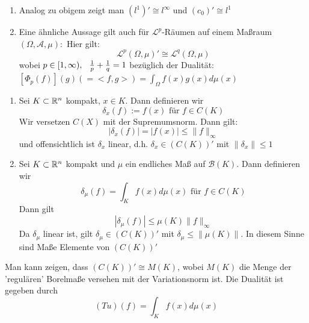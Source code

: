\begin{bemerkung}
	\begin{enumerate}[label=\alph*\upshape)]
		\item Analog zu obigem zeigt man $(l^{1})' \cong l^{\infty}$ und $(c_{0})' \cong l^{1}$
		\item Eine ähnliche Aussage gilt auch für $\mathcal{L}^{p}$-Räumen auf einem Ma{\ss}raum $(\Omega, \mathcal{A}, \mu):$
			Hier gilt:
			\[ \mathcal{L}^{p}(\Omega, \mu)' \cong \mathcal{L}^{q}(\Omega, \mu) \]
			wobei $p \in [1, \infty), \hspace{0.25cm} \frac{1}{p} + \frac{1}{q} = 1$ bezüglich der Dualität: $[\Phi_{p}(f)](g) (= <f, g>) = \int_{\Omega} f(x) g(x) d\mu(x)$ 
	\end{enumerate}	
\end{bemerkung}

\begin{beispiel}
	\begin{enumerate}[label=\alph*\upshape)]
		\item Sei $K \subset \mathbb{R}^{n}$ kompakt, $x \in K$. Dann definieren wir
			\[ \delta_{x}(f) := f(x) \text{ für } f \in C(K) \]
			Wir versetzen $C(X)$ mit der Supremumsnorm. Dann gilt:
			\[ |\delta_{x}(f)| = | f(x) | \leq \| f \|_{\infty} \]
			und offensichtlich ist $\delta_{x}$ linear, d.h. $\delta_{x} \in ( C(K) )'$ mit $\| \delta_{x} \| \leq 1$
		\item Sei $K \subset \mathbb{R}^{n}$ kompakt und $\mu$ ein endliches Ma{\ss} auf $\mathcal{B}(K)$. Dann definieren wir 
			\[ \delta_{\mu}(f) = \int_{K} f(x) d\mu(x) \text{ für } f \in C(K) \]
			Dann gilt
			\[ | \delta_{\mu} (f) | \leq \mu(K) \| f \| _{\infty} \]
			Da $\delta_{\mu}$ linear ist, gilt $\delta_{\mu}\in (C(K))'$ mit $\delta_{\mu} \leq \| \mu (K) \|$. In diesem Sinne sind Ma{\ss}e Elemente von $(C(K))'$
	\end{enumerate}	
\end{beispiel}

\begin{bemerkung}
	Man kann zeigen, dass $(C(K))' \cong M(K)$, wobei $M(K)$ die Menge der 'regulären' Borelma{\ss}e versehen mit der Variationsnorm ist. Die Dualität ist gegeben durch
	\[ (T u)(f) = \int_{K} f(x) d\mu(x) \]
\end{bemerkung}























